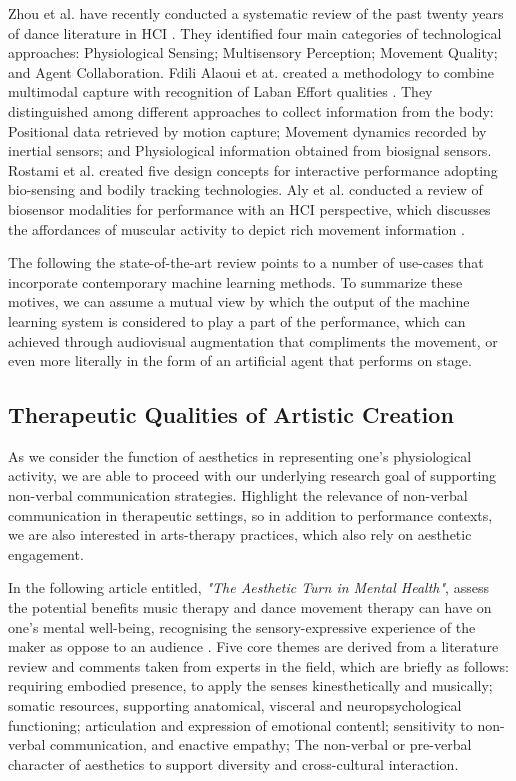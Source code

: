 

Zhou et al. have recently conducted a systematic review of the past twenty years of dance literature in HCI \cite{zhou_dance_2021}. They identified four main categories of technological approaches: Physiological Sensing; Multisensory Perception; Movement Quality; and Agent Collaboration. Fdili Alaoui et at. created a methodology to combine multimodal capture with recognition of Laban Effort qualities \cite{fdili_alaoui_seeing_2017}. They distinguished among different approaches to collect information from the body: Positional data retrieved by motion capture; Movement dynamics recorded by inertial sensors; and Physiological information obtained from biosignal sensors. Rostami et al. \cite{rostami_bio-sensed_2017} created five design concepts for interactive performance adopting bio-sensing and bodily tracking technologies. Aly et al. conducted a review of biosensor modalities for performance with an HCI perspective, which discusses the affordances of muscular activity to depict rich movement information \cite{aly_appropriating_2021}.

The following the state-of-the-art review points to a number of use-cases that incorporate contemporary machine learning methods. To summarize these motives, we can assume a mutual view by which the output of the machine learning system is considered to play a part of the performance, which can achieved through audiovisual augmentation that compliments the movement, or even more literally in the form of an artificial agent that performs on stage.

\subsection{Therapeutic Qualities of Artistic Creation}

As we consider the function of aesthetics in representing one's physiological activity, we are able to proceed with our underlying research goal of supporting non-verbal communication strategies. Highlight the relevance of non-verbal communication in therapeutic settings, so in addition to performance contexts, we are also interested in arts-therapy practices, which also rely on aesthetic engagement.

In the following article entitled, \textit{"The Aesthetic Turn in Mental Health"}, \citeauthor{samaritter_aesthetic_2018} assess the potential benefits music therapy and dance movement therapy can have on one's mental well-being, recognising the sensory-expressive experience of the maker as oppose to an audience \cite{samaritter_aesthetic_2018}. Five core themes are derived from a literature review and comments taken from experts in the field, which are briefly as follows: requiring embodied presence, to apply the senses kinesthetically and musically; somatic resources, supporting anatomical, visceral and neuropsychological functioning; articulation and expression of emotional contentl; sensitivity to non-verbal communication, and enactive empathy; The non-verbal or pre-verbal character of aesthetics to support diversity and cross-cultural interaction.


